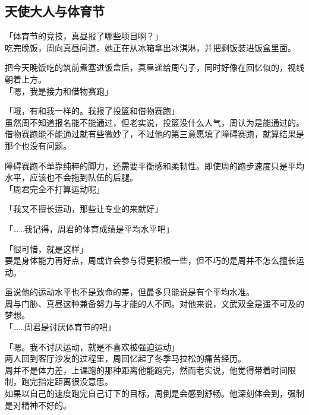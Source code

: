 \subsection{天使大人与体育节}

「体育节的竞技，真昼报了哪些项目啊？」\\

吃完晚饭，周向真昼问道。她正在从冰箱拿出冰淇淋，并把剩饭装进饭盒里面。

把今天晚饭吃的筑前煮塞进饭盒后，真昼递给周勺子，同时好像在回忆似的，视线朝着上方。\\

「嗯，我是接力和借物赛跑」

「哦，有和我一样的。我报了投篮和借物赛跑」\\

虽然周不知道报名能不能通过，但老实说，投篮没什么人气，周认为是能通过的。\\

借物赛跑能不能通过就有些微妙了，不过他的第三意愿填了障碍赛跑，就算结果是那个也没有问题。

障碍赛跑不单靠纯粹的脚力，还需要平衡感和柔韧性。即使周的跑步速度只是平均水平，应该也不会拖到队伍的后腿。\\

「周君完全不打算运动呢」

「我又不擅长运动，那些让专业的来就好」

「……我记得，周君的体育成绩是平均水平吧」

「很可惜，就是这样」\\

要是身体能力再好点，周或许会参与得更积极一些，但不巧的是周并不怎么擅长运动。

虽说他的运动水平也不是致命的差，但最多只能说是有个平均水准。\\

周与门胁、真昼这种兼备努力与才能的人不同。对他来说，文武双全是遥不可及的梦想。\\

「……周君是讨厌体育节的吧」

「嗯。我不讨厌运动，就是不喜欢被强迫运动」\\

两人回到客厅沙发的过程里，周回忆起了冬季马拉松的痛苦经历。\\

周并不是体力差，上课跑的那种距离他能跑完，然而老实说，他觉得带着时间限制，跑完指定距离很没意思。\\

如果以自己的速度跑完自己订下的目标，周倒是会感到舒畅。他深刻体会到，强制是对精神不好的。\\

